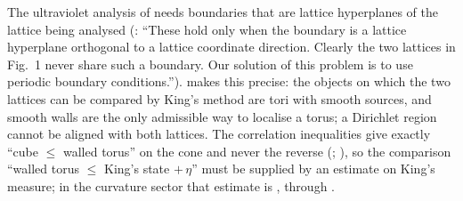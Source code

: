 The ultraviolet analysis of \cite{K1,K2} needs boundaries that are lattice hyperplanes of the lattice being analysed (\cite[p.~326]{K2}: ``These hold only when the boundary is a lattice hyperplane orthogonal to a lattice coordinate direction. Clearly the two lattices in Fig.~1 never share such a boundary. Our solution of this problem is to use periodic boundary conditions.'').  makes this precise: the objects on which the two lattices can be compared by King's method are tori with smooth sources, and smooth walls are the only admissible way to localise a torus; a Dirichlet region cannot be aligned with both lattices. The correlation inequalities give exactly ``cube $\le$ walled torus'' on the cone and never the reverse (; ), so the comparison ``walled torus $\le$ King's state $+\,\eta$'' must be supplied by an estimate on King's measure; in the curvature sector that estimate is \HS, through .

